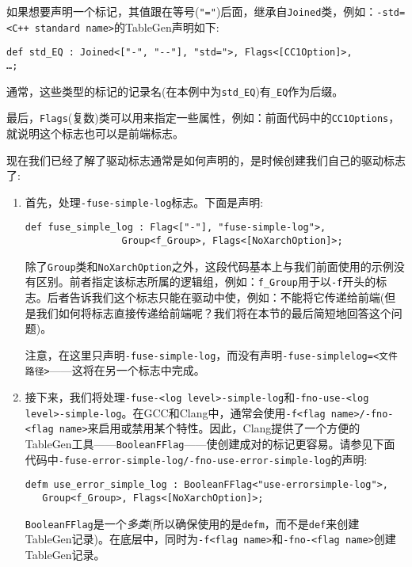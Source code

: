 如果想要声明一个标记，其值跟在等号(\texttt{"="})后面，继承自\texttt{Joined}类，例如：\texttt{-std=<C++ standard name>}的TableGen声明如下:

\begin{lstlisting}[style=styleJavaScript]
def std_EQ : Joined<["-", "--"], "std=">, Flags<[CC1Option]>,
…;
\end{lstlisting}

通常，这些类型的标记的记录名(在本例中为\texttt{std\_EQ})有\texttt{\_EQ}作为后缀。

最后，\texttt{Flags}(复数)类可以用来指定一些属性，例如：前面代码中的\texttt{CC1Options}，就说明这个标志也可以是前端标志。

现在我们已经了解了驱动标志通常是如何声明的，是时候创建我们自己的驱动标志了:

\begin{enumerate}
\item 首先，处理\texttt{-fuse-simple-log}标志。下面是声明:

\begin{lstlisting}[style=styleJavaScript]
def fuse_simple_log : Flag<["-"], "fuse-simple-log">,
                 Group<f_Group>, Flags<[NoXarchOption]>;
\end{lstlisting}

除了\texttt{Group}类和\texttt{NoXarchOption}之外，这段代码基本上与我们前面使用的示例没有区别。前者指定该标志所属的逻辑组，例如：\texttt{f\_Group}用于以\texttt{-f}开头的标志。后者告诉我们这个标志只能在驱动中使，例如：不能将它传递给前端(但是我们如何将标志直接传递给前端呢？我们将在本节的最后简短地回答这个问题)。

注意，在这里只声明\texttt{-fuse-simple-log}，而没有声明\texttt{-fuse-simplelog=<文件路径>}——这将在另一个标志中完成。

\item 接下来，我们将处理\texttt{-fuse-<log level>-simple-log}和\texttt{-fno-use-<log level>-simple-log}。在GCC和Clang中，通常会使用\texttt{-f<flag name>/-fno-<flag name>}来启用或禁用某个特性。因此，Clang提供了一个方便的TableGen工具——\texttt{BooleanFFlag}——使创建成对的标记更容易。请参见下面代码中\texttt{-fuse-error-simple-log/-fno-use-error-simple-log}的声明:

\begin{lstlisting}[style=styleJavaScript]
defm use_error_simple_log : BooleanFFlag<"use-errorsimple-log">,
   Group<f_Group>, Flags<[NoXarchOption]>;
\end{lstlisting}

\texttt{BooleanFFlag}是一个\textit{多类}(所以确保使用的是\texttt{defm}，而不是\texttt{def}来创建TableGen记录)。在底层中，同时为\texttt{-f<flag name>}和\texttt{-fno-<flag name>}创建TableGen记录。


\end{enumerate}
